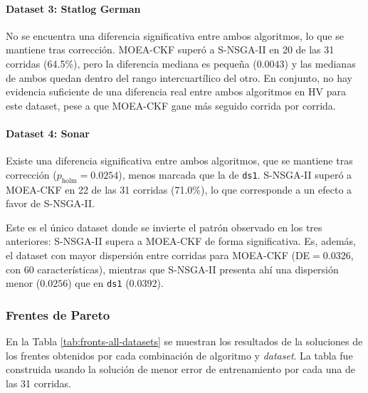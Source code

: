 \paragraph{Dataset 3: Statlog German}\label{sec:ds3}\label{sec:ds3-hv}
No se encuentra una diferencia significativa entre ambos algoritmos, lo que se mantiene tras corrección. MOEA-CKF superó a S-NSGA-II en 20 de las 31 corridas (64.5\%), pero la diferencia mediana es pequeña ($0.0043$) y las medianas de ambos quedan dentro del rango intercuartílico del otro. En conjunto, no hay evidencia suficiente de una diferencia real entre ambos algoritmos en HV para este dataset, pese a que MOEA-CKF gane más seguido corrida por corrida.

\paragraph{Dataset 4: Sonar}\label{sec:ds4}\label{sec:ds4-hv}
Existe una diferencia significativa entre ambos algoritmos, que se mantiene tras corrección ($p_{\text{holm}}=0.0254$), menos marcada que la de \texttt{ds1}. S-NSGA-II superó a MOEA-CKF en 22 de las 31 corridas (71.0\%), lo que corresponde a un efecto a favor de S-NSGA-II.

Este es el único dataset donde se invierte el patrón observado en los tres anteriores: S-NSGA-II supera a MOEA-CKF de forma significativa. Es, además, el dataset con mayor dispersión entre corridas para MOEA-CKF (DE$=0.0326$, con 60 características), mientras que S-NSGA-II presenta ahí una dispersión menor ($0.0256$) que en \texttt{ds1} ($0.0392$).

\subsubsection{Frentes de Pareto}
\label{sec:fronts}

En la Tabla \ref{tab:fronts-all-datasets} se muestran los resultados de la soluciones de los frentes obtenidos por cada combinación de algoritmo y \textit{dataset}. La tabla fue construida usando la solución de menor error de entrenamiento por cada una de las 31 corridas.


